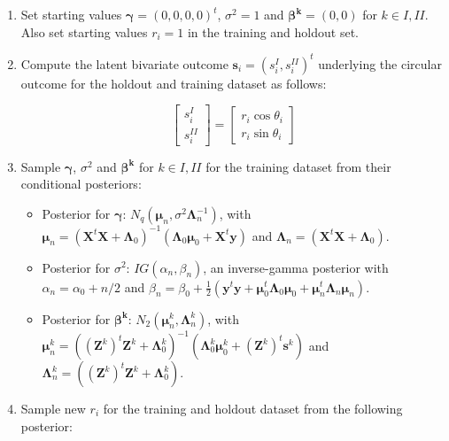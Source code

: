 \documentclass[11pt,]{article}
\begin{document}
\begin{appendices}
\begin{enumerate}
\item Set starting values $\boldsymbol{\gamma} = (0,0,0,0)^t$, $\sigma^2 = 1$ and $\boldsymbol{\beta^{k}} = (0,0)$ for $k \in I,II$. Also set starting values $r_i = 1$ in the training and holdout set. 

\item Compute the latent bivariate outcome $\boldsymbol{s}_i = (s_i^{I}, s_i^{II})^t$ underlying the circular outcome for the holdout and training dataset as follows:

$$\begin{bmatrix} s^{I}_{i} \\ s^{II}_{i} \end{bmatrix} = \begin{bmatrix} r_i \cos \theta_i \\  r_i\sin \theta_i\end{bmatrix}$$

\item Sample $\boldsymbol{\gamma}$, $\sigma^2$ and $\boldsymbol{\beta^{k}}$ for $k \in I,II$ for the training dataset from their conditional posteriors:

\begin{itemize}
\item Posterior for $\boldsymbol{\gamma}$: $N_q(\boldsymbol{\mu}_n, \sigma^2\boldsymbol{\Lambda}^{-1}_n)$, with $\boldsymbol{\mu}_n = (\boldsymbol{X}^t\boldsymbol{X} + \boldsymbol{\Lambda}_0)^{-1}(\boldsymbol{\Lambda}_0\boldsymbol{\mu}_0 + \boldsymbol{X}^t\boldsymbol{y})$ and $\boldsymbol{\Lambda}_n = (\boldsymbol{X}^t\boldsymbol{X} + \boldsymbol{\Lambda}_0)$.
\item Posterior for $\sigma^2$: $IG(\alpha_{n}, \beta_{n})$, an inverse-gamma posterior with $\alpha_{n} = \alpha_0 + n/2$ and $\beta_{n} = \beta_0 + \frac{1}{2}(\boldsymbol{y}^t\boldsymbol{y} + \boldsymbol{\mu}_{0}^t\boldsymbol{\Lambda}_0\boldsymbol{\mu}_{0} + \boldsymbol{\mu}_{n}^t\boldsymbol{\Lambda}_n\boldsymbol{\mu}_{n})$.
\item Posterior for $\boldsymbol{\beta^{k}}$: $N_2(\boldsymbol{\mu}^k_n, \boldsymbol{\Lambda}^{k}_n)$, with $\boldsymbol{\mu}^k_n = ((\boldsymbol{Z}^k)^t\boldsymbol{Z}^k + \boldsymbol{\Lambda}^k_0)^{-1}(\boldsymbol{\Lambda}^k_0\boldsymbol{\mu}^k_0 + (\boldsymbol{Z}^k)^t\boldsymbol{s}^k)$ and $\boldsymbol{\Lambda}^{k}_n = ((\boldsymbol{Z}^k)^t\boldsymbol{Z}^k + \boldsymbol{\Lambda}^k_0)$.
\end{itemize}

\item Sample new $r_i$ for the training and holdout dataset from the following posterior:


\end{enumerate}
\end{appendices}
\end{document}
